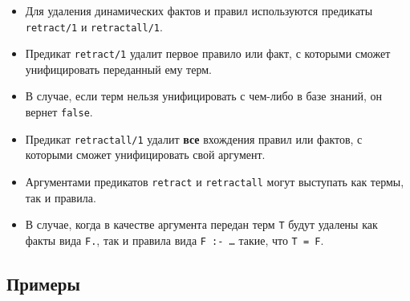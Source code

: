 \begin{frame}

	\frametitle{\insertsection}
	\framesubtitle{\insertsubsection}
	
	\begin{itemize}
		\item Для удаления динамических фактов и правил используются предикаты \texttt{retract/1} и \texttt{retractall/1}.
		\item Предикат \texttt{retract/1} удалит первое правило или факт, с которыми сможет унифицировать переданный ему терм.
		\item В случае, если терм нельзя унифицировать с чем-либо в базе знаний, он вернет \texttt{false}.
		\item Предикат \texttt{retractall/1} удалит \textbf{все} вхождения правил или фактов, с которыми сможет унифицировать свой аргумент.
		\item Аргументами предикатов \texttt{retract} и \texttt{retractall} могут выступать как термы, так и правила.
		\item В случае, когда в качестве аргумента передан терм \texttt{T} будут удалены как факты вида \texttt{F.}, так и правила вида \texttt{F :- \ldots} такие, что \texttt{T = F}.
	\end{itemize}

\end{frame}


\subsection{Примеры}


